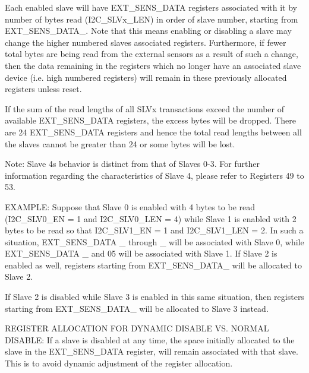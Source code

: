 Each enabled slave will have E\+X\+T\+\_\+\+S\+E\+N\+S\+\_\+\+D\+A\+TA registers associated with it by number of bytes read (I2\+C\+\_\+\+S\+L\+Vx\+\_\+\+L\+EN) in order of slave number, starting from E\+X\+T\+\_\+\+S\+E\+N\+S\+\_\+\+D\+A\+T\+A\+\_. Note that this means enabling or disabling a slave may change the higher numbered slaves\textquotesingle{} associated registers. Furthermore, if fewer total bytes are being read from the external sensors as a result of such a change, then the data remaining in the registers which no longer have an associated slave device (i.\+e. high numbered registers) will remain in these previously allocated registers unless reset.

If the sum of the read lengths of all S\+L\+Vx transactions exceed the number of available E\+X\+T\+\_\+\+S\+E\+N\+S\+\_\+\+D\+A\+TA registers, the excess bytes will be dropped. There are 24 E\+X\+T\+\_\+\+S\+E\+N\+S\+\_\+\+D\+A\+TA registers and hence the total read lengths between all the slaves cannot be greater than 24 or some bytes will be lost.

Note\+: Slave 4\textquotesingle{}s behavior is distinct from that of Slaves 0-\/3. For further information regarding the characteristics of Slave 4, please refer to Registers 49 to 53.

E\+X\+A\+M\+P\+LE\+: Suppose that Slave 0 is enabled with 4 bytes to be read (I2\+C\+\_\+\+S\+L\+V0\+\_\+\+EN = 1 and I2\+C\+\_\+\+S\+L\+V0\+\_\+\+L\+EN = 4) while Slave 1 is enabled with 2 bytes to be read so that I2\+C\+\_\+\+S\+L\+V1\+\_\+\+EN = 1 and I2\+C\+\_\+\+S\+L\+V1\+\_\+\+L\+EN = 2. In such a situation, E\+X\+T\+\_\+\+S\+E\+N\+S\+\_\+\+D\+A\+TA \+\_ through \+\_ will be associated with Slave 0, while E\+X\+T\+\_\+\+S\+E\+N\+S\+\_\+\+D\+A\+TA \+\_ and 05 will be associated with Slave 1. If Slave 2 is enabled as well, registers starting from E\+X\+T\+\_\+\+S\+E\+N\+S\+\_\+\+D\+A\+T\+A\+\_ will be allocated to Slave 2.

If Slave 2 is disabled while Slave 3 is enabled in this same situation, then registers starting from E\+X\+T\+\_\+\+S\+E\+N\+S\+\_\+\+D\+A\+T\+A\+\_ will be allocated to Slave 3 instead.

R\+E\+G\+I\+S\+T\+ER A\+L\+L\+O\+C\+A\+T\+I\+ON F\+OR D\+Y\+N\+A\+M\+IC D\+I\+S\+A\+B\+LE VS. N\+O\+R\+M\+AL D\+I\+S\+A\+B\+LE\+: If a slave is disabled at any time, the space initially allocated to the slave in the E\+X\+T\+\_\+\+S\+E\+N\+S\+\_\+\+D\+A\+TA register, will remain associated with that slave. This is to avoid dynamic adjustment of the register allocation.

